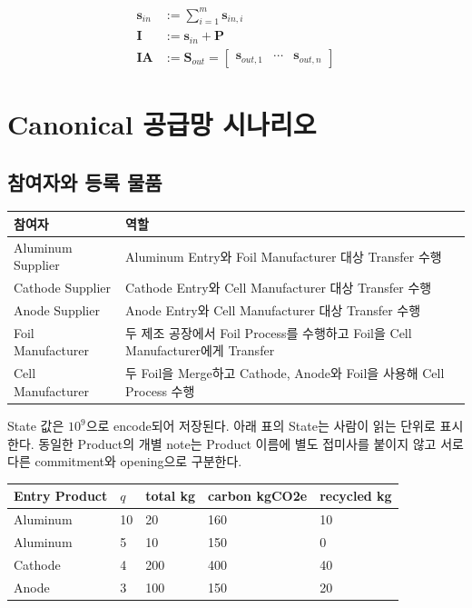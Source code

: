 \documentclass[11pt,a4paper]{extarticle}
\begin{document}
\[
  \begin{aligned}
    \mathbf{s}_{in}
     & := \sum_{i=1}^{m}\mathbf{s}_{in,i} \\[4pt]
    \mathbf{I}
     & := \mathbf{s}_{in}+\mathbf{P}      \\[4pt]
    \mathbf{I}\mathbf{A}
     & := \mathbf{S}_{out}
    =
    \begin{bmatrix}
      \mathbf{s}_{out,1} & \cdots & \mathbf{s}_{out,n}
    \end{bmatrix}
  \end{aligned}
\]

\section{Canonical 공급망 시나리오}

\subsection{참여자와 등록 물품}

\begin{center}
  \begin{tabularx}{\textwidth}{@{}lX@{}}
    \toprule
    참여자               & 역할                                                              \\
    \midrule
    Aluminum Supplier & Aluminum Entry와 Foil Manufacturer 대상 Transfer 수행                \\
    Cathode Supplier  & Cathode Entry와 Cell Manufacturer 대상 Transfer 수행                 \\
    Anode Supplier    & Anode Entry와 Cell Manufacturer 대상 Transfer 수행                   \\
    Foil Manufacturer & 두 제조 공장에서 Foil Process를 수행하고 Foil을 Cell Manufacturer에게 Transfer \\
    Cell Manufacturer & 두 Foil을 Merge하고 Cathode, Anode와 Foil을 사용해 Cell Process 수행       \\
    \bottomrule
  \end{tabularx}
\end{center}

State 값은 $10^9$으로 encode되어 저장된다. 아래 표의 State는 사람이 읽는 단위로
표시한다. 동일한 Product의 개별 note는 Product 이름에 별도 접미사를 붙이지 않고
서로 다른 commitment와 opening으로 구분한다.

\begin{center}
  \begin{tabular}{@{}l@{\hspace{10mm}}llll@{}}
    \toprule
    Entry Product & $q$ & total kg & carbon kgCO2e & recycled kg \\
    \midrule
    Aluminum      & 10  & 20       & 160           & 10          \\
    Aluminum      & 5   & 10       & 150           & 0           \\
    Cathode       & 4   & 200      & 400           & 40          \\
    Anode         & 3   & 100      & 150           & 20          \\
    \bottomrule
  \end{tabular}
\end{center}
\end{document}
